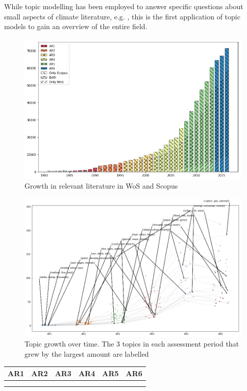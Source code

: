 \documentclass{article}
\begin{document}
While topic modelling has been employed to answer specific questions about small aspects of climate literature, e.g. \citep[e.g.][]{minx2016negative,Grubert2016}, this is the first application of topic models to gain an overview of the entire field.



\begin{figure}
	\includegraphics[width=\linewidth]{plots/wos_scopus_docs_time}
    \caption{Growth in relevant literature in WoS and Scopus}
    \label{growth}
\end{figure}


\begin{figure}
	\includegraphics[width=\linewidth]{plots/hot_topics}
    \caption{Topic growth over time. The 3 topics in each assessment period that grew by the largest amount are labelled}
\end{figure}

\begin{table}
\small
\setlength\tabcolsep{0cm}
\begin{tabular}{cccccc}
AR1 & AR2 & AR3 & AR4 & AR5 & AR6 \\
\midrule \\
 &   & 
 &   &   & 
\end{tabular}
\end{table}
\end{document}
